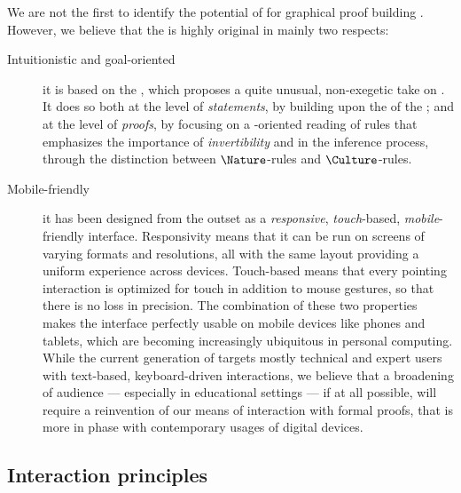 \begin{scope}
We are not the first to identify the potential of  for graphical proof
building . However, we believe that the
 is highly original in mainly two respects:
\begin{description}
  \item[Intuitionistic and goal-oriented] it is based on the , which proposes a quite unusual, non-exegetic take on . It
  does so both at the level of \emph{statements}, by building upon the
    of the ; and
  at the level of \emph{proofs}, by focusing on a -oriented reading of
  rules that emphasizes the importance of \emph{invertibility} and
  \emph{} in the inference process, through the distinction
  between $\Nature$-rules and $\Culture$-rules.
  \item[Mobile-friendly] it has been designed from the outset as a
  \emph{responsive}, \emph{touch}-based, \emph{mobile}-friendly interface.
  Responsivity means that it can be run on screens of varying formats and
  resolutions, all with the same layout providing a uniform experience across
  devices. Touch-based means that every pointing interaction is optimized for
  touch in addition to mouse gestures, so that there is no loss in precision.
  The combination of these two properties makes the interface perfectly usable
  on mobile devices like phones and tablets, which are becoming increasingly
  ubiquitous in personal computing. While the current generation of  targets mostly technical and expert users with text-based,
  keyboard-driven interactions, we believe that a broadening of audience ---
  especially in educational settings --- if at all possible, will require a
  reinvention of our means of interaction with formal proofs, that is more in
  phase with contemporary usages of digital devices.
\end{description}

\subsection{Interaction principles}


\end{scope}
